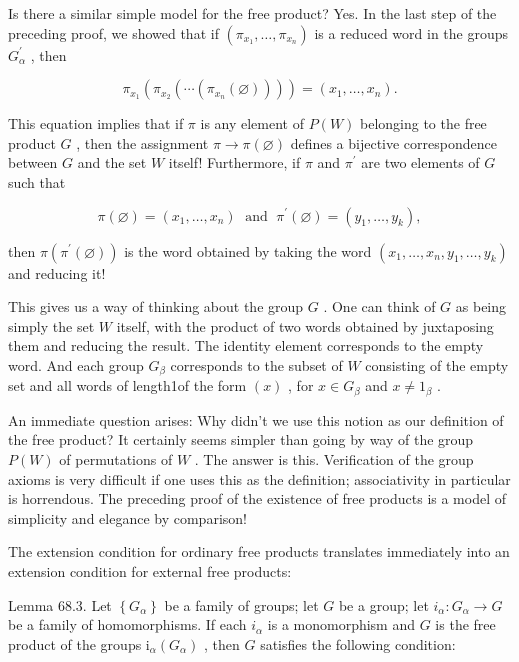 \documentclass[10pt]{article}
\begin{document}
Is there a similar simple model for the free product? Yes. In the last step of the preceding proof, we showed that if \(\left( {{\pi }_{{x}_{1}},\ldots ,{\pi }_{{x}_{n}}}\right)\) is a reduced word in the groups \({G}_{\alpha }^{\prime }\) , then

\[
{\pi }_{{x}_{1}}\left( {{\pi }_{{x}_{2}}\left( {\cdots \left( {{\pi }_{{x}_{n}}\left( \varnothing \right) }\right) }\right) }\right)  = \left( {{x}_{1},\ldots ,{x}_{n}}\right) .
\]

This equation implies that if \(\pi\) is any element of \(P\left( W\right)\) belonging to the free product \(G\) , then the assignment \(\pi  \rightarrow  \pi \left( \varnothing \right)\) defines a bijective correspondence between \(G\) and the set \(W\) itself! Furthermore, if \(\pi\) and \({\pi }^{\prime }\) are two elements of \(G\) such that

\[
\pi \left( \varnothing \right)  = \left( {{x}_{1},\ldots ,{x}_{n}}\right) \;\text{ and }\;{\pi }^{\prime }\left( \varnothing \right)  = \left( {{y}_{1},\ldots ,{y}_{k}}\right) ,
\]

then \(\pi \left( {{\pi }^{\prime }\left( \varnothing \right) }\right)\) is the word obtained by taking the word \(\left( {{x}_{1},\ldots ,{x}_{n},{y}_{1},\ldots ,{y}_{k}}\right)\) and reducing it!

This gives us a way of thinking about the group \(G\) . One can think of \(G\) as being simply the set \(W\) itself, with the product of two words obtained by juxtaposing them and reducing the result. The identity element corresponds to the empty word. And each group \({G}_{\beta }\) corresponds to the subset of \(W\) consisting of the empty set and all words of length1of the form \(\left( x\right)\) , for \(x \in  {G}_{\beta }\) and \(x \neq  {1}_{\beta }\) .

An immediate question arises: Why didn't we use this notion as our definition of the free product? It certainly seems simpler than going by way of the group \(P\left( W\right)\) of permutations of \(W\) . The answer is this. Verification of the group axioms is very difficult if one uses this as the definition; associativity in particular is horrendous. The preceding proof of the existence of free products is a model of simplicity and elegance by comparison!

The extension condition for ordinary free products translates immediately into an extension condition for external free products:

Lemma 68.3. Let \(\left\{  {G}_{\alpha }\right\}\) be a family of groups; let \(G\) be a group; let \({i}_{\alpha } : {G}_{\alpha } \rightarrow  G\) be a family of homomorphisms. If each \({i}_{\alpha }\) is a monomorphism and \(G\) is the free product of the groups \({\mathrm{i}}_{\alpha }\left( {G}_{\alpha }\right)\) , then \(G\) satisfies the following condition:
\end{document}
